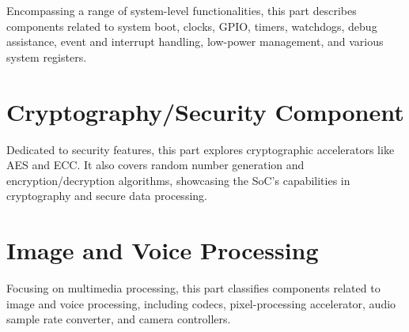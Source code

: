 \documentclass[openany, 10pt]{book}
\begin{document}

Encompassing a range of system-level functionalities, this part describes components related to system boot, clocks, GPIO, timers, watchdogs, debug assistance, event and interrupt handling, low-power management, and various system registers.




\part{Cryptography/Security Component}

Dedicated to security features, this part explores cryptographic accelerators like AES and ECC. It also covers random number generation and encryption/decryption algorithms, showcasing the SoC's capabilities in cryptography and secure data processing.




\part{Image and Voice Processing}

Focusing on multimedia processing, this part classifies components related to image and voice processing, including codecs, pixel-processing accelerator, audio sample rate converter, and camera controllers.

\end{document}
